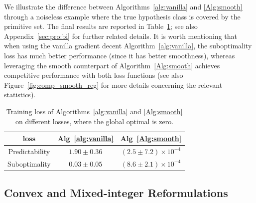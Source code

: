 \documentclass{article}
\theoremstyle{plain}
\begin{document}
We illustrate the difference between Algorithms~\ref{alg:vanilla} and \ref{Alg:smooth} through a noiseless example where the true hypothesis class is covered by the primitive set. The final results are reported in Table~\ref{table:alg_exp}; see also Appendix~\ref{sec:pro:bi} for further related details. It is worth mentioning that when using the vanilla gradient decent Algorithm~\ref{alg:vanilla}, the suboptimality loss has much better performance (since it has better smoothness), whereas leveraging the smooth counterpart of Algorithm~\ref{Alg:smooth} achieves competitive performance with both loss functions (see also Figure~\ref{fig:comp_smooth_reg} for more details concerning the relevant statistics). 
\begin{table}[h!]
    \centering
    \caption{Training loss of Algorithms~\ref{alg:vanilla} and \ref{Alg:smooth} on different losses, where the global optimal is zero.}\label{table:alg_exp}
    \begin{tabular}{|c|c|c|}
    \hline

    loss          & Alg~\ref{alg:vanilla} & Alg~\ref{Alg:smooth} \\
    \hline
 
    Predictability     & $1.90 \pm 0.36$ & $(2.5 \pm 7.2) \times 10^{-4}$ \\

    \hline
    Suboptimality     & $0.03 \pm 0.05$ & $(8.6 \pm 2.1) \times 10^{-4}$ \\
    \hline
    \end{tabular}
\end{table}

 
\subsection{Convex  and Mixed-integer Reformulations}\label{sec:convexandmilp}
\end{document}
